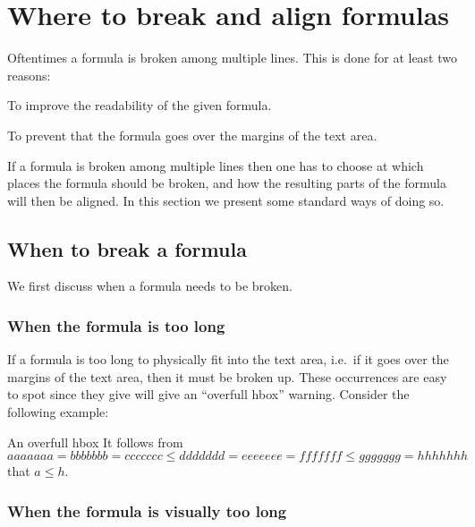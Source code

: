 \section{Where to break and align formulas}
\label{break and align ponts}

Oftentimes a formula is broken among multiple lines.
This is done for at least two reasons:
\begin{myitemize}
  \item
    To improve the readability of the given formula.
  \item
    To prevent that the formula goes over the margins of the text area.
\end{myitemize}
If a formula is broken among multiple lines then one has to choose at which places the formula should be broken, and how the resulting parts of the formula will then be aligned.
In this section we present some standard ways of doing so.



\subsection{When to break a formula}

We first discuss when a formula needs to be broken.

\subsubsection{When the formula is too long}

If a formula is too long to physically fit into the text area, i.e.\ if it goes over the margins of the text area, then it must be broken up.
These occurrences are easy to spot since they give will give an \enquote{overfull hbox} warning.
Consider the following example:
\begingroup
\begin{showlatex}[before lower = {\hfuzz = 40pt}, after lower = {\hfuzz = 0pt}]{An overfull hbox}
  It follows from
  \[
    aaaaaaa
    =
    bbbbbbb
    =
    ccccccc
    \leq
    ddddddd
    =
    eeeeeee
    =
    fffffff
    \leq
    ggggggg
    =
    hhhhhhh
  \]
  that $a \leq h$.
\end{showlatex}
\endgroup

\subsubsection{When the formula is visually too long}

